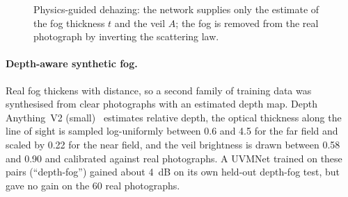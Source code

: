 \begin{figure}[t]
\centering
{}
\caption{Physics-guided dehazing: the network supplies only the estimate of the
fog thickness $t$ and the veil $A$; the fog is removed from the real photograph
by inverting the scattering law.}
\label{fig:physics}
\end{figure}

\paragraph{Depth-aware synthetic fog.} Real fog thickens with distance, so a
second family of training data was synthesised from clear photographs with an
estimated depth map. Depth Anything~V2 (small)~\cite{yang2024depthanythingv2}
estimates relative depth, the optical thickness along the line of sight is
sampled log-uniformly between 0.6 and 4.5 for the far field and scaled by 0.22
for the near field, and the veil brightness is drawn between 0.58 and 0.90 and
calibrated against real photographs. A UVMNet trained on these pairs
(``depth-fog'') gained about 4~dB on its own held-out depth-fog test, but gave no
gain on the 60 real photographs.
\label{sec:depthfog}

